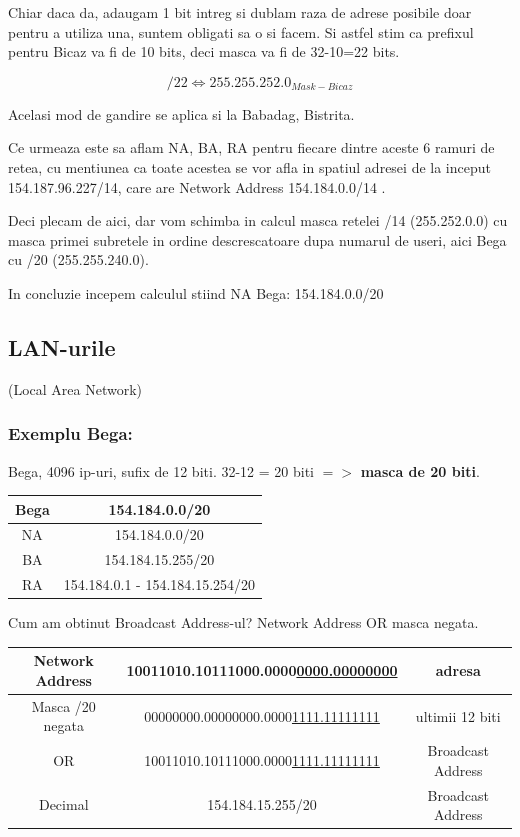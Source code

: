 \documentclass{article}
\begin{document}
Chiar daca da, adaugam 1 bit intreg si dublam raza de adrese posibile doar pentru a utiliza una, suntem obligati sa o si facem. Si astfel stim ca prefixul pentru Bicaz va fi de 10 bits, deci masca va fi de 32-10=22 bits. 

\[/22 \Leftrightarrow 255.255.252.0_{Mask-Bicaz} \]

Acelasi mod de gandire se aplica si la Babadag, Bistrita.


Ce urmeaza este sa aflam NA, BA, RA pentru fiecare dintre aceste 6 ramuri de retea, cu mentiunea ca toate acestea se vor afla in spatiul adresei de la inceput 154.187.96.227/14, care are Network Address 154.184.0.0/14 .

Deci plecam de aici, dar vom schimba in calcul masca retelei /14 (255.252.0.0) cu masca primei subretele in ordine descrescatoare dupa numarul de useri, aici Bega cu /20 (255.255.240.0). 

In concluzie incepem calculul stiind NA Bega: 154.184.0.0/20
\newpage
\subsection{LAN-urile} (Local Area Network)
\subsubsection{Exemplu Bega:}


Bega, 4096 ip-uri, sufix de 12 biti. 32-12 = 20 biti $=>$ \textbf{masca de 20 biti}.
\begin{center}
    \begin{tabular}{|c|c|}
    \hline
        Bega & 154.184.0.0/20 \\
    \hline
        NA & 154.184.0.0/20  \\
            \hline
        BA & 154.184.15.255/20\\
            \hline
        RA &  154.184.0.1 - 154.184.15.254/20 \\
            \hline
    \end{tabular}
\end{center}
Cum am obtinut Broadcast Address-ul? Network Address OR masca negata.

\begin{center}
   \begin{tabular}{|c|c|c|}
   \hline
      Network Address &  10011010.10111000.0000\underline{0000.00000000} & adresa  \\
    \hline
      Masca /20 negata  &  00000000.00000000.0000\underline{1111.11111111} & ultimii 12 biti \\
    \hline \hline
       OR & 10011010.10111000.0000\underline{1111.11111111} & Broadcast Address\\
    \hline
        Decimal & 154.184.15.255/20 &  Broadcast Address\\
    \hline
    \end{tabular}
\end{center}
\end{document}
